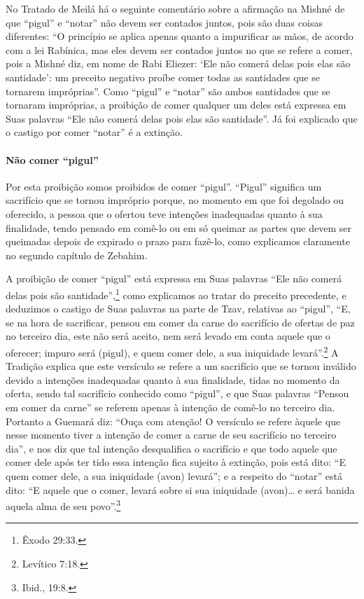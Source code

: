 No Tratado de Meilá há o seguinte comentário sobre a afirmação na Mishné
de que ``pigul'' e ``notar'' não devem ser contados juntos, pois são
duas coisas diferentes: ``O princípio se aplica apenas quanto a
impurificar as mãos, de acordo com a lei Rabínica, mas eles devem ser
contados juntos no que se refere a comer, pois a Mishné diz, em nome de
Rabi Eliezer: `Ele não comerá delas pois elas são santidade': um
preceito negativo proíbe comer todas as santidades que se tornarem
impróprias''. Como ``pigul'' e ``notar'' são ambos santidades que se
tornaram impróprias, a proibição de comer qualquer um deles está
expressa em Suas palavras ``Ele não comerá delas pois elas são
santidade''. Já foi explicado que o castigo por comer ``notar'' é a
extinção.

\paragraph{Não comer ``pigul''}

Por esta proibição somos proibidos de comer ``pigul''. ``Pigul''
significa um sacrifício que se tornou impróprio porque, no momento em
que foi degolado ou oferecido, a pessoa que o ofertou teve intenções
inadequadas quanto à sua finalidade, tendo pensado em comê-lo ou em só
queimar as partes que devem ser queimadas depois de expirado o prazo
para fazê-lo, como explicamos claramente no segundo capítulo de
Zebahim.

A proibição de comer ``pigul'' está expressa em Suas palavras ``Ele não
comerá delas pois são santidade'',\footnote{Êxodo 29:33.} como explicamos ao
tratar do preceito precedente, e deduzimos o castigo de Suas palavras
na parte de Tzav, relativas ao ``pigul'', ``E, se na hora de sacrificar,
pensou em comer da carne do sacrifício de ofertas de paz no terceiro
dia, este não será aceito, nem será levado em conta aquele que o
oferecer; impuro será (pigul), e quem comer dele, a sua iniquidade
levará''.\footnote{Levítico 7:18.} A Tradição explica que este versículo se
refere a um sacrifício que se tornou inválido devido a intenções
inadequadas quanto à sua finalidade, tidas no momento da oferta, sendo
tal sacrifício conhecido como ``pigul'', e que Suas palavras ``Pensou em
comer da carne'' se referem apenas à intenção de comê-lo no terceiro
dia. Portanto a Guemará diz: ``Ouça com atenção! O versículo se refere
àquele que nesse momento tiver a intenção de comer a carne de seu
sacrifício no terceiro dia'', e nos diz que tal intenção desqualifica o
sacrifício e que todo aquele que comer dele após ter tido essa intenção
fica sujeito à extinção, pois está dito: ``E quem comer dele, a sua
iniquidade (avon) levará''; e a respeito do ``notar'' está dito: ``E
aquele que o comer, levará sobre si sua iniquidade (avon)\ldots{} e será
banida aquela alma de seu povo''.\footnote{Ibid., 19:8.}


